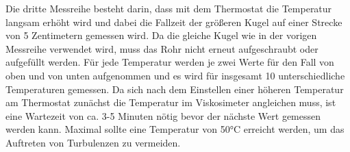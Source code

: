 %
Die dritte Messreihe besteht darin, dass mit dem Thermostat die Temperatur langsam erhöht wird
und dabei die Fallzeit der größeren Kugel auf einer Strecke von 5 Zentimetern gemessen wird.
Da die gleiche Kugel wie in der vorigen Messreihe verwendet wird, muss das Rohr nicht erneut aufgeschraubt oder aufgefüllt werden.
Für jede Temperatur werden je zwei Werte für den Fall von oben und von unten aufgenommen und es wird für insgesamt 10 unterschiedliche Temperaturen gemessen.
Da sich nach dem Einstellen einer höheren Temperatur am Thermostat zunächst die Temperatur im Viskosimeter angleichen muss, 
ist eine Wartezeit von ca. 3-5 Minuten nötig bevor der nächste Wert gemessen werden kann.
 Maximal sollte eine Temperatur von 50°C erreicht werden, um das Auftreten von Turbulenzen zu vermeiden.
